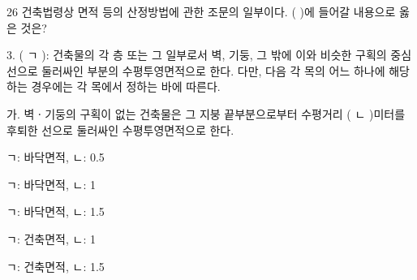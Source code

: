 \begin{question}{26}
건축법령상 면적 등의 산정방법에 관한 조문의 일부이다. ( )에 들어갈 내용으로 옳은 것은?
\begin{framedtext}
3. ( ㄱ ): 건축물의 각 층 또는 그 일부로서 벽, 기둥, 그 밖에 이와 비슷한 구획의 중심선으로 둘러싸인 부분의 수평투영면적으로 한다. 다만, 다음 각 목의 어느 하나에 해당하는 경우에는 각 목에서 정하는 바에 따른다. \par
\hspace*{1em}가. 벽ㆍ기둥의 구획이 없는 건축물은 그 지붕 끝부분으로부터 수평거리 ( ㄴ )미터를 후퇴한 선으로 둘러싸인 수평투영면적으로 한다. \par
\end{framedtext}
\begin{choices}
  \item ㄱ: 바닥면적, ㄴ: 0.5
  \item ㄱ: 바닥면적, ㄴ: 1
  \item ㄱ: 바닥면적, ㄴ: 1.5
  \item ㄱ: 건축면적, ㄴ: 1
  \item ㄱ: 건축면적, ㄴ: 1.5
\end{choices}
\end{question}
